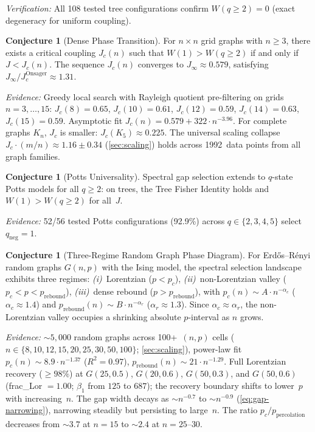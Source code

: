 \documentclass[11pt]{article}
\theoremstyle{definition}
\newtheorem{conjecture}[theorem]{Conjecture}
\theoremstyle{remark}
\begin{document}
\noindent\emph{Verification:} All 108 tested tree configurations confirm
$W(q \geq 2) = 0$ (exact degeneracy for uniform coupling).

\begin{conjecture}[Dense Phase Transition]
\label{conj:dense}
For $n \times n$ grid graphs with $n \geq 3$, there exists a critical coupling
$J_c(n)$ such that $W(1) > W(q \geq 2)$ if and only if $J < J_c(n)$.
The sequence $J_c(n)$ converges to $J_\infty \approx 0.579$, satisfying
$J_\infty / J_c^{\mathrm{Onsager}} \approx 1.31$.
\end{conjecture}

\noindent\emph{Evidence:} Greedy local search with Rayleigh quotient
pre-filtering on grids $n = 3, \ldots, 15$:
$J_c(8) = 0.65$, $J_c(10) = 0.61$, $J_c(12) = 0.59$, $J_c(14) = 0.63$,
$J_c(15) = 0.59$. Asymptotic fit $J_c(n) = 0.579 + 322 \cdot n^{-3.96}$.
For complete graphs $K_n$, $J_c$ is smaller: $J_c(K_5) \approx 0.225$.
The universal scaling collapse $J_c \cdot (m/n) \approx 1.16 \pm 0.34$
(\cref{sec:scaling}) holds across 1992~data points from all graph families.

\begin{conjecture}[Potts Universality]
\label{conj:potts}
Spectral gap selection extends to $q$-state Potts models for all $q \geq 2$:
on trees, the Tree Fisher Identity holds and $W(1) > W(q \geq 2)$ for all~$J$.
\end{conjecture}

\noindent\emph{Evidence:} 52/56 tested Potts configurations (92.9\%) across
$q \in \{2,3,4,5\}$ select $q_{\mathrm{neg}}=1$.

\begin{conjecture}[Three-Regime Random Graph Phase Diagram]
\label{conj:random-phase}
For Erd\H{o}s--R\'{e}nyi random graphs $G(n,p)$ with the Ising model,
the spectral selection landscape exhibits three regimes:
\emph{(i)}~Lorentzian ($p < p_c$),
\emph{(ii)}~non-Lorentzian valley ($p_c < p < p_{\mathrm{rebound}}$),
\emph{(iii)}~dense rebound ($p > p_{\mathrm{rebound}}$), with
$p_c(n) \sim A \cdot n^{-\alpha_c}$ ($\alpha_c \approx 1.4$) and
$p_{\mathrm{rebound}}(n) \sim B \cdot n^{-\alpha_r}$ ($\alpha_r \approx 1.3$).
Since $\alpha_c \approx \alpha_r$, the non-Lorentzian valley
occupies a shrinking absolute $p$-interval as $n$ grows.
\end{conjecture}

\noindent\emph{Evidence:} ${\sim}5{,}000$ random graphs across 100+~$(n,p)$ cells
($n \in \{8, 10, 12, 15, 20, 25, 30, 50, 100\}$; \cref{sec:scaling}), power-law fit
$p_c(n) \sim 8.9 \cdot n^{-1.37}$ ($R^2 = 0.97$),
$p_{\mathrm{rebound}}(n) \sim 21 \cdot n^{-1.29}$.
Full Lorentzian recovery ($\geq 98\%$) at
$G(25, 0.5)$, $G(20, 0.6)$, $G(50, 0.3)$, and $G(50, 0.6)$
(frac\_Lor $= 1.00$; $\beta_1$ from $125$ to $687$); the recovery boundary
shifts to lower~$p$ with increasing~$n$.
The gap width decays as $\sim n^{-0.7}$ to $\sim n^{-0.9}$
(\cref{eq:gap-narrowing}), narrowing steadily but persisting to
large~$n$. The ratio $p_c / p_{\mathrm{percolation}}$ decreases from
${\sim}3.7$ at $n = 15$ to ${\sim}2.4$ at $n = 25$--$30$.
\end{document}
